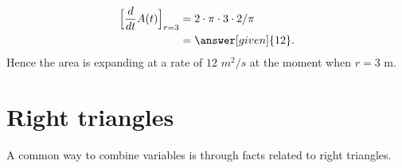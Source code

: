\documentclass{ximera}
\begin{document}
\begin{example}
\begin{explanation}
    \begin{align*}
     \Bigl[ \dfrac{d}{dt}A(t)\Bigr]_{r=3} &= 2\cdot \pi\cdot 3 \cdot 2/\pi\\
      &=\answer[given]{12}.
    \end{align*}
    Hence the area is expanding at a rate of $12$ $m^2/s$ at the moment when $r=3$ m.
  \end{explanation}
\end{example}





\section{Right triangles}

A common way to combine variables is through facts related to right
triangles.
\end{document}
